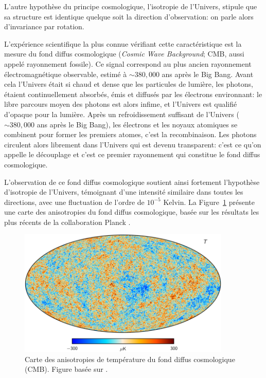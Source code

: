 \documentclass[../main/main.tex]{subfiles}
\begin{document}
L'autre hypothèse du principe cosmologique, l'isotropie de l'Univers,
stipule que sa structure est identique quelque soit la direction
d'observation: on parle alors d'invariance par rotation.

L'expérience scientifique la plus connue vérifiant cette caractéristique
est la mesure du fond diffus cosmologique (\textit{Cosmic Wave
  Background}; CMB, aussi appelé rayonnement fossile). Ce signal correspond au plus ancien rayonnement
électromagnétique observable, estimé à $\sim380,000$ ans après le Big
Bang. Avant cela l'Univers était si chaud et dense que les particules
de lumière, les photons, étaient continuellement absorbés, émis et
diffusés par les électrons environnant: le libre parcours moyen des
photons est alors infime, et l'Univers est qualifié \og d'opaque\fg{} pour la
lumière.
Après un refroidissement suffisant de l'Univers ($\sim380,000$ ans après le Big
Bang), les électrons et
les noyaux atomiques se combinent pour former les premiers atomes, c'est
la recombinaison. Les photons circulent alors librement dans l'Univers
qui est devenu \og transparent\fg{}: c'est ce qu'on appelle le découplage et
c'est ce premier rayonnement qui constitue le fond diffus cosmologique.

L'observation de ce fond diffus cosmologique soutient ainsi fortement l'hypothèse
d'isotropie de l'Univers, témoignant d'une intensité similaire dans
toutes les directions, avec une fluctuation de l'ordre de $10^{-5}$
Kelvin.
La Figure~\ref{fig:cmb} présente une carte des anisotropies du fond
diffus cosmologique, basée sur les résultats les plus récents de la
collaboration Planck \citep{Planckisotropy18}.
\begin{figure}[ht]
  \centering
  \includegraphics[width=0.9\textwidth]{../figures/01_cosmology/CMB_Planck18.png}
  \caption[Carte des anisotropies de température du fond diffus
  cosmologique (CMB).]{Carte des anisotropies de température du fond
    diffus cosmologique (CMB). Figure basée sur
    \citet{Planckisotropy18}.}
\label{fig:cmb}
\end{figure}
\end{document}
